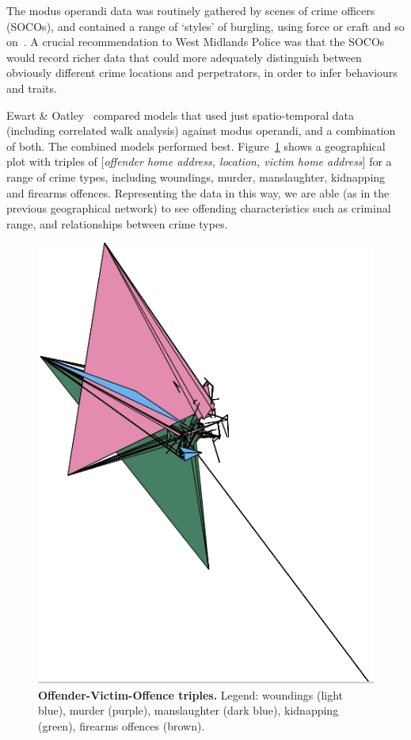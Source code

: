 \documentclass{llncs}
\begin{document}
The modus operandi data was routinely gathered by scenes of crime
officers (SOCOs), and contained a range of `styles' of burgling, using
force or craft and so on~\cite{ewart+oatley:2003}.  A crucial
recommendation to West Midlands Police was that the SOCOs would record
richer data that could more adequately distinguish between obviously
different crime locations and perpetrators, in order to infer
behaviours and traits.


Ewart \& Oatley~\cite{ewart+oatley:2003} compared models that used
just spatio-temporal data (including correlated walk analysis) against
modus operandi, and a combination of both. The combined models
performed best. Figure~\ref{fig:offvictrips} shows a geographical plot
with triples of [\emph{offender home address, location, victim home
address}] for a range of crime types, including woundings, murder,
manslaughter, kidnapping and firearms offences. Representing the data
in this way, we are able (as in the previous geographical network) to
see offending characteristics such as criminal range, and
relationships between crime types.

\begin{figure}[!ht]
\centering
\includegraphics[width=0.6\columnwidth]{images/OffenderVictimOffenceTriples.jpg}
\caption{{\textbf{Offender-Victim-Offence triples.}} Legend: woundings (light blue), murder (purple), manslaughter (dark blue), kidnapping (green), firearms offences (brown).}
\label{fig:offvictrips} 
\end{figure}
\end{document}
